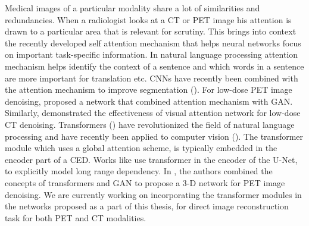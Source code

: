Medical images of a particular modality share a lot of similarities and redundancies. When a radiologist looks at a \ac{CT} or \ac{PET} image his attention is drawn to a particular area that is relevant for scrutiny. This brings into context the recently developed self attention mechanism that helps neural networks focus on important task-specific information. In natural language processing attention mechanism helps identify the context of a sentence and which words in a sentence are more important for translation etc. \acp{CNN} have recently been combined with the attention mechanism to improve segmentation (\cite{li2020attention,hu2020parallel}). For low-dose \ac{PET} image denoising, \cite{xue20203d} proposed a network that combined attention mechanism with \ac{GAN}. Similarly, \cite{du2019visual} demonstrated the effectiveness of visual attention network for low-dose \ac{CT} denoising. Transformers (\cite{vaswani2017attention}) have revolutionized the field of natural language processing and have recently been applied to computer vision (\cite{khan2021transformers}). The transformer module which uses a global attention scheme, is typically embedded in the encoder part of a \ac{CED}. Works like \cite{chen2021transunet} use transformer in the encoder of the U-Net, to explicitly model long range dependency. In \cite{luo20213d}, the authors combined the concepts of transformers and \acs{GAN} to propose a 3-D network for \ac{PET} image denoising. We are currently working on incorporating the transformer modules in the networks proposed as a part of this thesis, for direct image reconstruction task for both \ac{PET} and \ac{CT} modalities.


